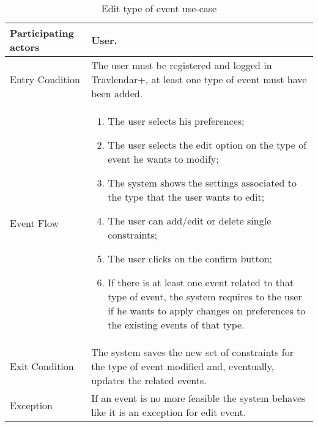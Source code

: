 \begin{table}[H]
	\begin{center}
		\begin{tabular}{ | p{} | p{} | }
		\hline
		Participating actors &  User.\\
		\hline
		Entry Condition & The user must be registered and logged in Travlendar+, at least one type of event must have been added.\\
		\hline
		Event Flow & 
			\begin{enumerate}
				\item The user selects his preferences;
				\item The user selects the edit option on the type of event he wants to modify;
				\item The system shows the settings associated to the type that the user wants to edit;
				\item The user can add/edit or delete single constraints;
				\item The user clicks on the confirm button;
				\item If there is at least one event related to that type of event, the system requires to the user if he wants to apply changes on preferences to the existing events of that type. 
			\end{enumerate} \\
		\hline
		Exit Condition & The system saves the new set of constraints for the type of event modified and, eventually, updates the related events. \\
		\hline
		Exception & If an event is no more feasible the system behaves like it is an exception for edit event.\\ 
		\hline
		\end{tabular}
	\end{center}
	\caption{Edit type of event use-case}
\end{table}
